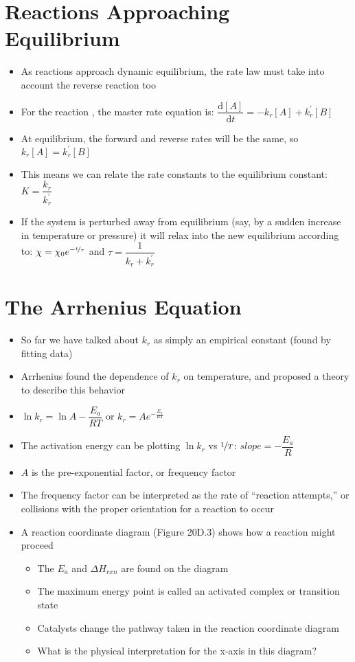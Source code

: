 \documentclass[12pt, openany, letterpaper]{memoir}
\begin{document}
\section{Reactions Approaching Equilibrium}
\begin{itemize}
	\item As reactions approach dynamic equilibrium, the rate law must take into account the reverse reaction too
	\item For the reaction , the master rate equation is: $\dfrac{\mathrm{d}[A]}{\mathrm{d}t}=-k_r[A]+k_r^\prime[B]$
	\item At equilibrium, the forward and reverse rates will be the same, so $k_r[A]=k_r^\prime[B]$
	\item This means we can relate the rate constants to the equilibrium constant: $K=\dfrac{k_r}{k_r^\prime}$
	\item If the system is perturbed away from equilibrium (say, by a sudden increase in temperature or pressure) it will relax into the new equilibrium according to: $\chi = \chi_0e^{-\nicefrac{t}{\tau}}$ and $\tau = \dfrac{1}{k_r + k_r^\prime}$
\end{itemize}

\section{The Arrhenius Equation}
\begin{itemize}
	\item So far we have talked about $k_r$ as simply an empirical constant (found by fitting data)
	\item Arrhenius found the dependence of $k_r$ on temperature, and proposed a theory to describe this behavior
	\item $\ln k_r = \ln A - \dfrac{E_a}{RT}$ or $k_r = Ae^{-\frac{E_a}{RT}}$
	\item The activation energy can be plotting $\ln k_r$ vs $\nicefrac{1}{T}$: $slope = -\dfrac{E_a}{R}$
	\item $A$ is the pre-exponential factor, or frequency factor
	\item The frequency factor can be interpreted as the rate of “reaction attempts,” or collisions with the proper orientation for a reaction to occur
	\item A reaction coordinate diagram (Figure 20D.3) shows how a reaction might proceed
	      \begin{itemize}
		      \item The $E_a$ and $\Delta H_{rxn}$ are found on the diagram
		      \item The maximum energy point is called an activated complex or transition state
		      \item Catalysts change the pathway taken in the reaction coordinate diagram
		      \item What is the physical interpretation for the x-axis in this diagram?
	      \end{itemize}
\end{itemize}
\end{document}
